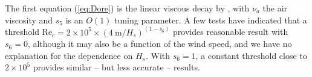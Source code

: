 \noindent 
The first equation (\ref{eq:Dore}) is the linear viscous decay by
\cite{art:Dore78}, with $\nu_a$ the air viscosity and $s_5$ is an $O(1)$
tuning parameter. A few tests have indicated that a threshold Re$_{c}=2 \times
10^5 \times (4~\mathrm{m}/H_s)^{(1-s_6)}$ provides reasonable result with
$s_6=0$, although it may also be a function of the wind speed, and we have no
explanation for the dependence on $H_s$.  With $s_6=1$, a constant threshold
close to $2 \times 10^5$ provides similar -- but less accurate -- results.


\begin{landscape}
\begin{table} 
\begin{center} 

\end{center}
\end{table}
\end{landscape}
